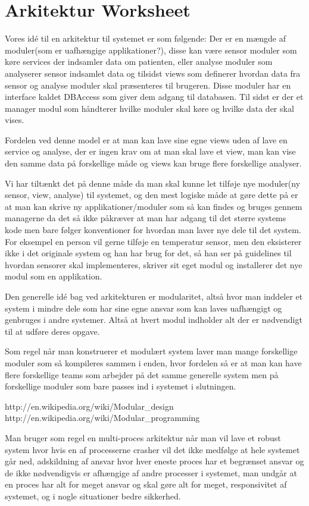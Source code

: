 \chapter{Arkitektur Worksheet}
Vores idé til en arkitektur til systemet er som følgende:
Der er en mængde af moduler(som er uafhængige applikationer?), disse kan være sensor moduler som køre services der indsamler data om patienten, eller analyse moduler som analyserer sensor indsamlet data og tilsidst views som definerer hvordan data fra sensor og analyse moduler skal præsenteres til brugeren. Disse moduler har en interface kaldet DBAccess som giver dem adgang til databasen. Til sidst er der et manager modul som håndterer hvilke moduler skal køre og hvilke data der skal vises.

Fordelen ved denne model er at man kan lave sine egne views uden af lave en service og analyse, der er ingen krav om at man skal lave et view, man kan vise den samme data på forskellige måde og views kan bruge flere forskellige analyser.

Vi har tiltænkt det på denne måde da man skal kunne let tilføje nye moduler(ny sensor, view, analyse) til systemet, og den mest logiske måde at gøre dette på er at man kan skrive ny applikationer/moduler som så kan findes og bruges gennem managerne da det så ikke påkræver at man har adgang til det større systems kode men bare følger konventioner for hvordan man laver nye dele til det system. For eksempel en person vil gerne tilføje en temperatur sensor, men den eksisterer ikke i det originale system og han har brug for det, så han ser på guidelines til hvordan sensorer skal implementeres, skriver sit eget modul og installerer det nye modul som en applikation.

Den generelle idé bag ved arkitekturen er modularitet, altså hvor man inddeler et system i mindre dele som har sine egne ansvar som kan laves uafhængigt og genbruges i andre systemer. Altså at hvert modul indholder alt der er nødvendigt til at udføre deres opgave.

Som regel når man konstruerer et modulært system laver man mange forskellige moduler som så kompileres sammen i enden, hvor fordelen så er at man kan have flere forskellige teams som arbejder på det samme generelle system men på forskellige moduler som bare passes ind i systemet i slutningen. 

http://en.wikipedia.org/wiki/Modular_design
http://en.wikipedia.org/wiki/Modular_programming

Man bruger som regel en multi-proces arkitektur når man vil lave et robust system hvor hvis en af processerne crasher vil det ikke medfølge at hele systemet går ned, adskildning af ansvar hvor hver eneste proces har et begrænset ansvar og de ikke nødvendigvis er afhængige af andre processer i systemet, man undgår at en proces har alt for meget ansvar og skal gøre alt for meget, responsivitet af systemet, og i nogle situationer bedre sikkerhed.

